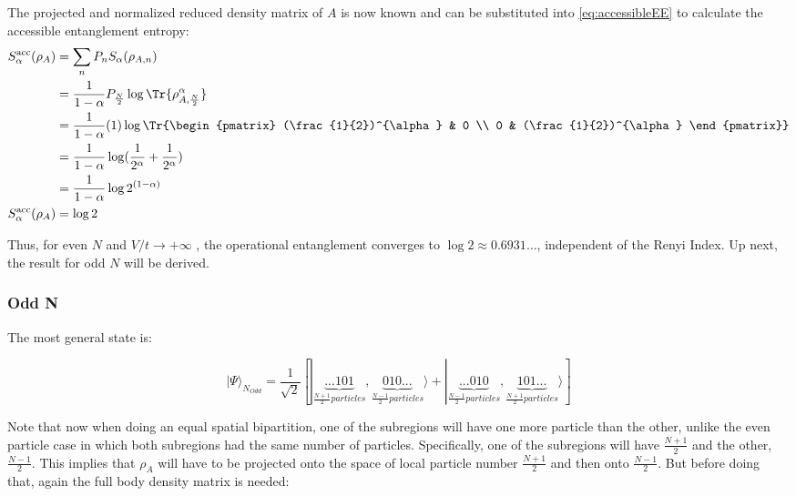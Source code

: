 \begin{samepage}
The projected and normalized reduced density matrix of $A$ is now known and can be substituted into \ref{eq:accessibleEE} to calculate the accessible entanglement entropy:
\begin {align} 
S_{\alpha}^{\mathrm{acc}}(\rho_A) &= \sum_{n} P_n S_{\alpha}(\rho_{A,n}) \nonumber \\
&=  \frac{1}{1-\alpha} P_{\frac{N}{2}} \log{\Tr{\rho_{A,\frac{N}{2}}^{\alpha}}} \nonumber \\
&= \frac{1}{1-\alpha} (1) \log{\Tr{\begin{pmatrix}  (\frac{1}{2})^{\alpha} & 0 \\ 0 & (\frac{1}{2})^{\alpha}   \end{pmatrix}}} \nonumber \\
&= \frac{1}{1-\alpha} \log({\frac{1}{2^{\alpha}} + \frac{1}{2^{\alpha}}}) \nonumber \\
&= \frac{1}{1-\alpha} \log{2^{(1-\alpha)}} \nonumber \\
S_{\alpha}^{\mathrm{acc}}(\rho_A) &= \log{2}
\end {align}

Thus, for even $N$ and $V/t \to + \infty$ , the operational entanglement converges to $\log{2} \approx 0.6931\dots$, independent of the Renyi Index. Up next, the result for odd $N$ will be derived.

	\subsubsection{Odd N}
	
	The most general state is:
	
	\begin{equation}
	| \Psi \rangle_{N_{Odd}} = \frac{1}{\sqrt{2}} [|\underbrace{...101}_{\frac{N+1}{2} particles}, \underbrace{010...}_{\frac{N-1}{2} particles} \rangle + |\underbrace{...010}_{\frac{N-1}{2} particles}, \underbrace{101...}_{\frac{N+1}{2} particles} \rangle ]
	\end{equation}
	
	Note that now when doing an equal spatial bipartition, one of the subregions will have one more particle than the other, unlike the even particle case in which both subregions had the same number of particles. Specifically, one of the subregions will have $\frac{N+1}{2}$ and the other, $\frac{N-1}{2}$. This implies that $\rho_{A}$ will have to be projected onto the space of local particle number $\frac{N+1}{2}$ and then onto $\frac{N-1}{2}$. But before doing that, again the full body density matrix is needed:
	

\end{samepage}

